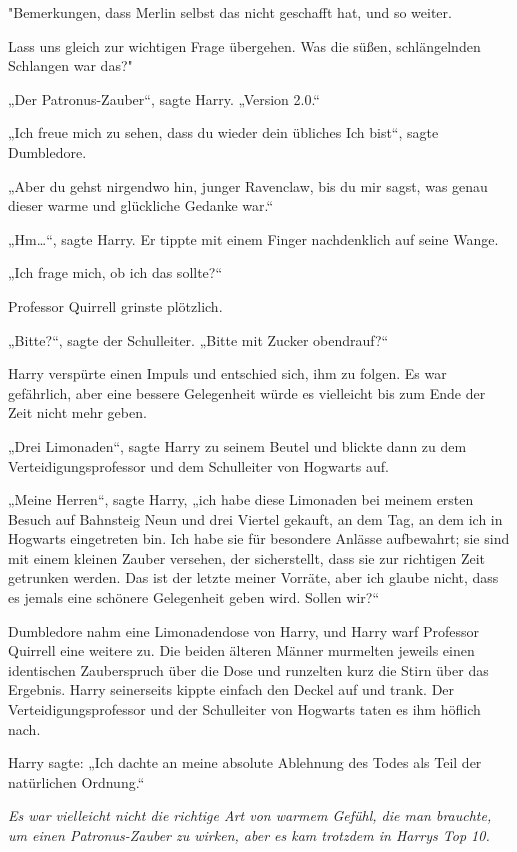 {"Bemerkungen, dass Merlin selbst das nicht geschafft hat, und so weiter.

Lass uns gleich zur wichtigen Frage übergehen. Was die süßen, schlängelnden Schlangen war das?"

„Der Patronus-Zauber“, sagte Harry. „Version 2.0.“

„Ich freue mich zu sehen, dass du wieder dein übliches Ich bist“, sagte Dumbledore.

„Aber du gehst nirgendwo hin, junger Ravenclaw, bis du mir sagst, was genau dieser warme und glückliche Gedanke war.“

„Hm…“, sagte Harry. Er tippte mit einem Finger nachdenklich auf seine Wange.

„Ich frage mich, ob ich das sollte?“

Professor Quirrell grinste plötzlich.

„Bitte?“, sagte der Schulleiter. „Bitte mit Zucker obendrauf?“

Harry verspürte einen Impuls und entschied sich, ihm zu folgen. Es war gefährlich, aber eine bessere Gelegenheit würde es vielleicht bis zum Ende der Zeit nicht mehr geben.

„Drei Limonaden“, sagte Harry zu seinem Beutel und blickte dann zu dem Verteidigungsprofessor und dem Schulleiter von Hogwarts auf.

„Meine Herren“, sagte Harry, „ich habe diese Limonaden bei meinem ersten Besuch auf Bahnsteig Neun und drei Viertel gekauft, an dem Tag, an dem ich in Hogwarts eingetreten bin. Ich habe sie für besondere Anlässe aufbewahrt; sie sind mit einem kleinen Zauber versehen, der sicherstellt, dass sie zur richtigen Zeit getrunken werden. Das ist der letzte meiner Vorräte, aber ich glaube nicht, dass es jemals eine schönere Gelegenheit geben wird. Sollen wir?“

Dumbledore nahm eine Limonadendose von Harry, und Harry warf Professor Quirrell eine weitere zu. Die beiden älteren Männer murmelten jeweils einen identischen Zauberspruch über die Dose und runzelten kurz die Stirn über das Ergebnis. Harry seinerseits kippte einfach den Deckel auf und trank. Der Verteidigungsprofessor und der Schulleiter von Hogwarts taten es ihm höflich nach.

Harry sagte: „Ich dachte an meine absolute Ablehnung des Todes als Teil der natürlichen Ordnung.“

\emph{Es war vielleicht nicht die richtige Art von warmem Gefühl, die man brauchte, um einen Patronus-Zauber zu wirken, aber es kam trotzdem in Harrys Top 10.}

}
